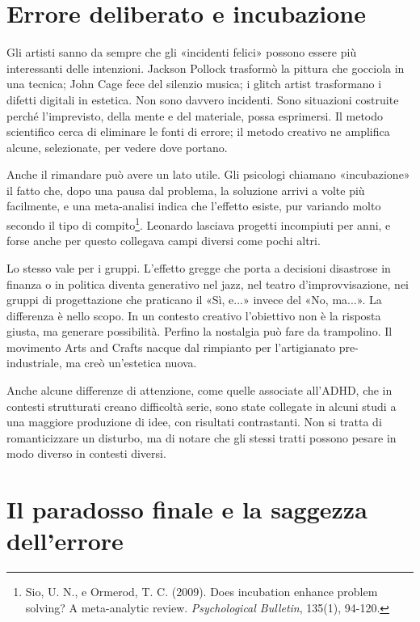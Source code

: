 \section{Errore deliberato e incubazione}

Gli artisti sanno da sempre che gli «incidenti felici» possono essere più interessanti delle intenzioni. Jackson Pollock trasformò la pittura che gocciola in una tecnica; John Cage fece del silenzio musica; i glitch artist trasformano i difetti digitali in estetica. Non sono davvero incidenti. Sono situazioni costruite perché l'imprevisto, della mente e del materiale, possa esprimersi. Il metodo scientifico cerca di eliminare le fonti di errore; il metodo creativo ne amplifica alcune, selezionate, per vedere dove portano.

Anche il rimandare può avere un lato utile. Gli psicologi chiamano «incubazione» il fatto che, dopo una pausa dal problema, la soluzione arrivi a volte più facilmente, e una meta-analisi indica che l'effetto esiste, pur variando molto secondo il tipo di compito\footnote{Sio, U. N., e Ormerod, T. C. (2009). Does incubation enhance problem solving? A meta-analytic review. \textit{Psychological Bulletin}, 135(1), 94-120.}. Leonardo lasciava progetti incompiuti per anni, e forse anche per questo collegava campi diversi come pochi altri.

Lo stesso vale per i gruppi. L'effetto gregge che porta a decisioni disastrose in finanza o in politica diventa generativo nel jazz, nel teatro d'improvvisazione, nei gruppi di progettazione che praticano il «Sì, e...» invece del «No, ma...». La differenza è nello scopo. In un contesto creativo l'obiettivo non è la risposta giusta, ma generare possibilità. Perfino la nostalgia può fare da trampolino. Il movimento Arts and Crafts nacque dal rimpianto per l'artigianato pre-industriale, ma creò un'estetica nuova.

Anche alcune differenze di attenzione, come quelle associate all'ADHD, che in contesti strutturati creano difficoltà serie, sono state collegate in alcuni studi a una maggiore produzione di idee, con risultati contrastanti. Non si tratta di romanticizzare un disturbo, ma di notare che gli stessi tratti possono pesare in modo diverso in contesti diversi.

\section{Il paradosso finale e la saggezza dell'errore}
\label{sec:p4c17-paradosso-finale}


